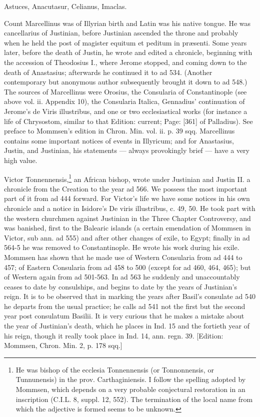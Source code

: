 Astuces, Anacutasur, Celianus, Imaclas.

Count Marcellinus was of Illyrian birth and Latin was his native tongue. He was cancellarius of Justinian, before Justinian ascended the throne and probably when he held the post of magister equitum et peditum in præsenti. Some years later, before the death of Justin, he wrote and edited a chronicle, beginning with the accession of Theodosius I., where Jerome stopped, and coming down to the death of Anastasius; afterwards he continued it to ad 534. (Another contemporary but anonymous author subsequently brought it down to ad 548.) The sources of Marcellinus were Orosius, the Consularia of Constantinople (see above vol. ii. Appendix 10), the Consularia Italica, Gennadius\texthebrew{}’ continuation of Jerome\texthebrew{}’s de Viris illustribus, and one or two ecclesiastical works (for instance a life of Chrysostom, similar to that Edition: current; Page: [361] of Palladius). See preface to Mommsen\texthebrew{}’s edition in Chron. Min. vol. ii. p. 39 sqq. Marcellinus contains some important notices of events in Illyricum; and for Anastasius, Justin, and Justinian, his statements \texthebrew{—} always provokingly brief \texthebrew{—} have a very high value.

Victor Tonnennensis,\footnote{He was bishop of the ecclesia Tonnennensis (or Tonnonnensis, or Tunnunensis) in the prov. Carthaginiensis. I follow the spelling adopted by Mommsen, which depends on a very probable conjectural restoration in an inscription (C.I.L. 8, suppl. 12, 552). The termination of the local name from which the adjective is formed seems to be unknown.} an African bishop, wrote under Justinian and Justin II. a chronicle from the Creation to the year ad 566. We possess the most important part of it from ad 444 forward. For Victor\texthebrew{}’s life we have some notices in his own chronicle and a notice in Isidore\texthebrew{}’s De viris illustribus, c. 49, 50. He took part with the western churchmen against Justinian in the Three Chapter Controversy, and was banished, first to the Balearic islands (a certain emendation of Mommsen in Victor, sub ann. ad 555) and after other changes of exile, to Egypt; finally in ad 564-5 he was removed to Constantinople. He wrote his work during his exile. Mommsen has shown that he made use of Western Consularia from ad 444 to 457; of Eastern Consularia from ad 458 to 500 (except for ad 460, 464, 465); but of Western again from ad 501-563. In ad 563 he suddenly and unaccountably ceases to date by consulships, and begins to date by the years of Justinian\texthebrew{}’s reign. It is to be observed that in marking the years after Basil\texthebrew{}’s consulate ad 540 he departs from the usual practice; he calls ad 541 not the first but the second year post consulatum Basilii. It is very curious that he makes a mistake about the year of Justinian\texthebrew{}’s death, which he places in Ind. 15 and the fortieth year of his reign, though it really took place in Ind. 14, ann. regn. 39. [Edition: Mommsen, Chron. Min. 2, p. 178 sqq.]

